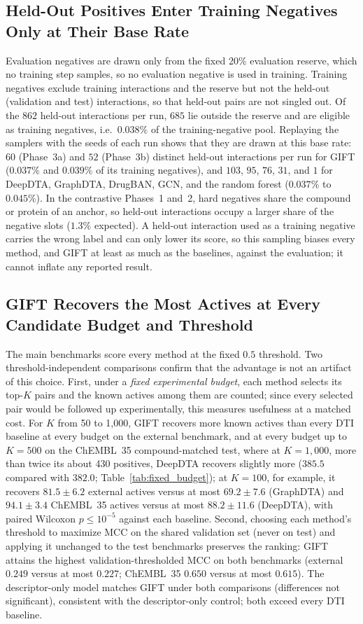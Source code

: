 \documentclass[11pt,letterpaper]{article}
\begin{document}
\subsection{Held-Out Positives Enter Training Negatives Only at Their Base Rate}
\label{sec:robust_negatives}
Evaluation negatives are drawn only from the fixed 20\% evaluation reserve, which no training step samples, so no evaluation negative is used in training. Training negatives exclude training interactions and the reserve but not the held-out (validation and test) interactions, so that held-out pairs are not singled out. Of the $862$ held-out interactions per run, $685$ lie outside the reserve and are eligible as training negatives, i.e.\ $0.038\%$ of the training-negative pool. Replaying the samplers with the seeds of each run shows that they are drawn at this base rate: $60$ (Phase~3a) and $52$ (Phase~3b) distinct held-out interactions per run for GIFT ($0.037\%$ and $0.039\%$ of its training negatives), and $103$, $95$, $76$, $31$, and $1$ for DeepDTA, GraphDTA, DrugBAN, GCN, and the random forest ($0.037\%$ to $0.045\%$). In the contrastive Phases~1 and~2, hard negatives share the compound or protein of an anchor, so held-out interactions occupy a larger share of the negative slots ($1.3\%$ expected). A held-out interaction used as a training negative carries the wrong label and can only lower its score, so this sampling biases every method, and GIFT at least as much as the baselines, against the evaluation; it cannot inflate any reported result.

\subsection{GIFT Recovers the Most Actives at Every Candidate Budget and Threshold}
\label{sec:fixed_budget}
The main benchmarks score every method at the fixed $0.5$ threshold. Two threshold-independent comparisons confirm that the advantage is not an artifact of this choice. First, under a \emph{fixed experimental budget}, each method selects its top-$K$ pairs and the known actives among them are counted; since every selected pair would be followed up experimentally, this measures usefulness at a matched cost. For $K$ from 50 to 1{,}000, GIFT recovers more known actives than every DTI baseline at every budget on the external benchmark, and at every budget up to $K=500$ on the ChEMBL~35 compound-matched test, where at $K=1{,}000$, more than twice its about 430 positives, DeepDTA recovers slightly more ($385.5$ compared with $382.0$; Table~\ref{tab:fixed_budget}); at $K=100$, for example, it recovers $81.5\pm6.2$ external actives versus at most $69.2\pm7.6$ (GraphDTA) and $94.1\pm3.4$ ChEMBL~35 actives versus at most $88.2\pm11.6$ (DeepDTA), with paired Wilcoxon $p\leq10^{-5}$ against each baseline. Second, choosing each method's threshold to maximize MCC on the shared validation set (never on test) and applying it unchanged to the test benchmarks preserves the ranking: GIFT attains the highest validation-thresholded MCC on both benchmarks (external $0.249$ versus at most $0.227$; ChEMBL~35 $0.650$ versus at most $0.615$). The descriptor-only model matches GIFT under both comparisons (differences not significant), consistent with the descriptor-only control; both exceed every DTI baseline.
\end{document}
